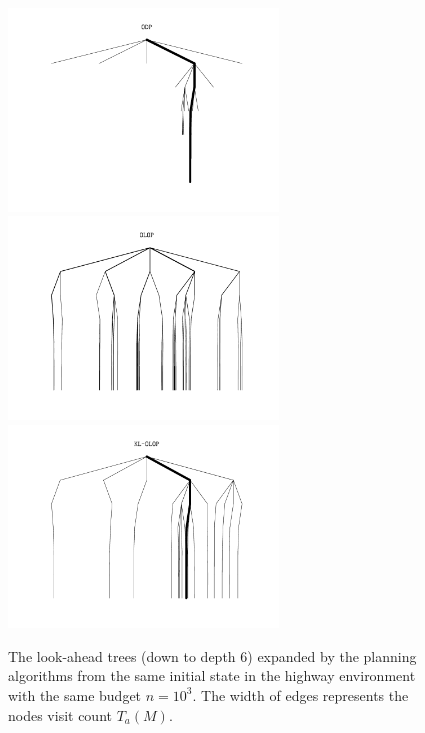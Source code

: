 \documentclass[runningheads, envcountsame, a4paper]{llncs}
\begin{document}
\begin{figure}[pth]
	\centering
	
	\includegraphics[width=0.64\textwidth]{img/tree_OPD_svg-tex} \includegraphics[width=0.64\textwidth]{img/tree_OLOP_svg-tex}
	\includegraphics[width=0.64\textwidth]{img/tree_KL-OLOP_svg-tex}
	
	\caption{The look-ahead trees (down to depth 6) expanded by the planning algorithms from the same initial state in the highway environment with the same budget $n=10^3$. The width of edges represents the nodes visit count $T_a(M)$.}
	\label{fig:trees}
\end{figure}
\end{document}
